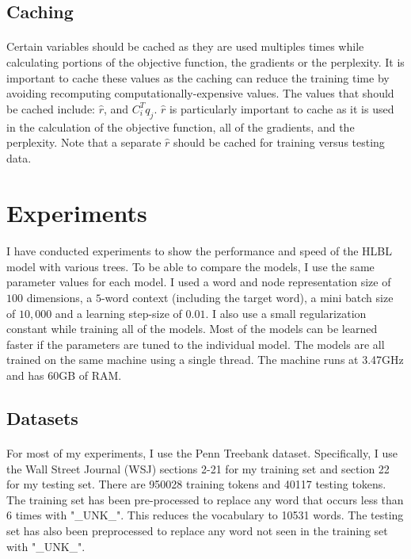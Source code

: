 \subsection{Caching}
\paragraph{}
Certain variables should be cached as they are used multiples times while calculating portions of the objective function, the gradients or the perplexity. It is important to cache these values as the caching can reduce the training time by avoiding recomputing computationally-expensive values. The values that should be cached include: $\hat{r}$, and $C_i^T q_j$. $\hat{r}$ is particularly important to cache as it is used in the calculation of the objective function, all of the gradients, and the perplexity. Note that a separate $\hat{r}$ should be cached for training versus testing data.

\section{Experiments} \label{sec:experiments}
\paragraph{}
I have conducted experiments to show the performance and speed of the HLBL model with various trees. To be able to compare the models, I use the same parameter values for each model. I used a word and node representation size of $100$ dimensions, a $5$-word context (including the target word), a mini batch size of $10,000$ and a learning step-size of $0.01$. I also use a small regularization constant while training all of the models. Most of the models can be learned faster if the parameters are tuned to the individual model. The models are all trained on the same machine using a single thread. The machine runs at 3.47GHz and has 60GB of RAM.

\subsection{Datasets}
\paragraph{}
For most of my experiments, I use the Penn Treebank dataset. Specifically, I use the Wall Street Journal (WSJ) sections 2-21 for my training set and section 22 for my testing set. There are 950028 training tokens and 40117 testing tokens. The training set has been pre-processed to replace any word that occurs less than 6 times with "\_UNK\_". This reduces the vocabulary to 10531 words. The testing set has also been preprocessed to replace any word not seen in the training set with "\_UNK\_".
